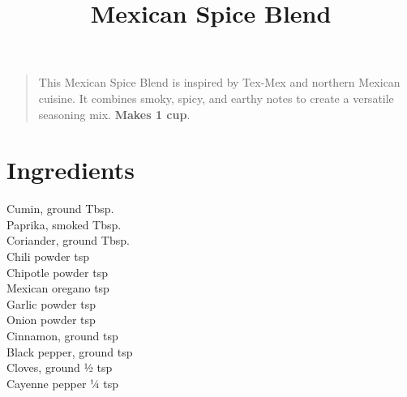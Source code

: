 \documentclass[11pt,letterpaper]{article}
\title{Mexican Spice Blend}
\author{}
\date{}
\begin{document}
\maketitle
\thispagestyle{empty}

\begin{quote}
\small
\begin{em}
This Mexican Spice Blend is inspired by Tex-Mex and northern Mexican cuisine. It combines smoky, spicy, and earthy notes to create a versatile seasoning mix. \textbf{Makes 1 cup}.
\end{em}
\end{quote}

\section*{Ingredients}
\setlength{\columnsep}{20pt}
\begin{multicols}{2}
\noindent
    Cumin, ground  Tbsp. \\
    Paprika, smoked  Tbsp. \\
    Coriander, ground  Tbsp. \\
    Chili powder  tsp \\
    Chipotle powder  tsp \\
    Mexican oregano  tsp \\
    Garlic powder  tsp \\
    Onion powder  tsp \\
    Cinnamon, ground  tsp \\
    Black pepper, ground  tsp \\
    Cloves, ground \dotfill ½ tsp \\
    Cayenne pepper \dotfill ¼ tsp
\end{multicols}
\end{document}
